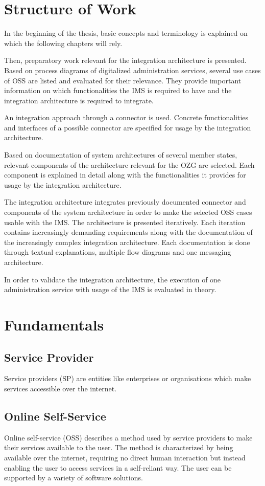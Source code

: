 \documentclass[
     12pt,         %
     a4paper,      %
     BCOR=10mm,version=first,     %
     DIV=14,version=first,        %
     ]{scrreprt}
\begin{document}
\chapter{Structure of Work}

In the beginning of the thesis, basic concepts and terminology is explained on which the following chapters will rely.

Then, preparatory work relevant for the integration architecture is presented. Based on process diagrams of digitalized administration services, several use cases of OSS are listed and evaluated for their relevance. They provide important information on which functionalities the IMS is required to have and the integration architecture is required to integrate.

An integration approach through a connector is used. Concrete functionalities and interfaces of a possible connector are specified for usage by the integration architecture.

Based on documentation of system architectures of several member states, relevant components of the architecture relevant for the OZG are selected. Each component is explained in detail along with the functionalities it provides for usage by the integration architecture.

The integration architecture integrates previously documented connector and components of the system architecture in order to make the selected OSS cases usable with the IMS. The architecture is presented iteratively. Each iteration contains increasingly demanding requirements along with the documentation of the increasingly complex integration architecture. Each documentation is done through textual explanations, multiple flow diagrams and one messaging architecture.

In order to validate the integration architecture, the execution of one administration service with usage of the IMS is evaluated in theory.

\chapter{Fundamentals}


\section{Service Provider}
Service providers (SP) are entities like enterprises or organisations which make services accessible over the internet.

\section{Online Self-Service}
Online self-service (OSS) describes a method used by service providers to make their services available to the user. The method is characterized by being available over the internet, requiring no direct human interaction but instead enabling the user to access services in a self-reliant way. The user can be supported by a variety of software solutions.
\end{document}
